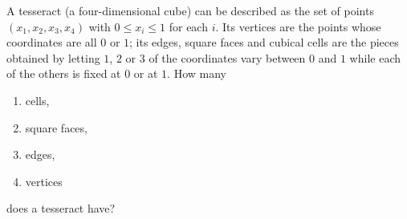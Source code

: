 A tesseract (a four-dimensional cube) can be described as the set of points $(x_1,x_2,x_3,x_4)$ with $0\le x_i\le1$ for each $i$. Its vertices are the points whose coordinates are all $0$ or $1$; its edges, square faces and cubical cells are the pieces obtained by letting $1$, $2$ or $3$ of the coordinates vary between $0$ and $1$ while each of the others is fixed at $0$ or at $1$. How many
\begin{enumerate}
\item[(a)] cells,
\item[(b)] square faces,
\item[(c)] edges,
\item[(d)] vertices
\end{enumerate}
does a tesseract have?
